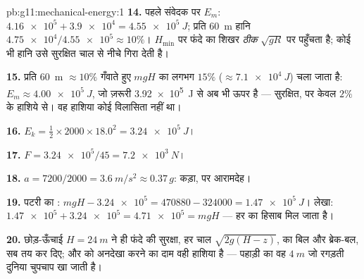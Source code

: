 \begin{solution}{pb:g11:mechanical-energy:1}
\textbf{14.} पहले संवेदक पर $E_m$: $\num{4.16e5} + \num{3.9e4} =
\qty{4.55e5}{J}$; प्रति \qty{60}{m} हानि $\num{4.75e4}/\num{4.55e5} \approx 10\%$।
$H_{\min}$ पर फंदे का शिखर \emph{ठीक} $\sqrt{gR}$ पर पहुँचता है; कोई भी हानि उसे
सुरक्षित चाल से नीचे गिरा देती है।

\textbf{15.} प्रति \qty{60}{m} $\approx 10\%$ गँवाते हुए $mgH$ का लगभग $15\%$
($\approx \qty{7.1e4}{J}$) चला जाता है: $E_m \approx \qty{4.00e5}{J}$, जो ज़रूरी \qty{3.92e5}{J} से अब भी ऊपर है --- सुरक्षित,
पर केवल $2\%$ के हाशिये से। वह हाशिया कोई विलासिता नहीं था।

\textbf{16.} $E_k = \tfrac12 \times 2000 \times 18.0^2 =
\qty{3.24e5}{J}$।

\textbf{17.} $F = \num{3.24e5}/45 = \qty{7.2e3}{N}$।

\textbf{18.} $a = 7200/2000 = \qty{3.6}{m/s^2} \approx 0.37\,g$: कड़ा, पर आरामदेह।

\textbf{19.} पटरी का : $mgH - \num{3.24e5} = \num{470880} -
\num{324000} = \qty{1.47e5}{J}$। लेखा: $\num{1.47e5} + \num{3.24e5} =
\num{4.71e5} = mgH$ --- हर
 का हिसाब मिल जाता है।

\textbf{20.} छोड़-ऊँचाई $H = \qty{24}{m}$ ने ही फंदे की सुरक्षा, हर चाल $\sqrt{2g(H - z)}$,
 का बिल और ब्रेक-बल, सब तय कर दिए; और 
को अनदेखा करने का दाम वही हाशिया है --- पहाड़ी का वह $\qty{4}{m}$ जो रगड़ती दुनिया
चुपचाप खा जाती है।
\end{solution}
